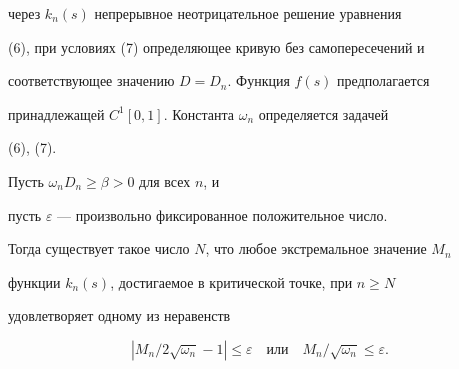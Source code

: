 через $k_n(s)$ непрерывное неотрицательное решение уравнения


(6), при условиях (7) определяющее кривую без самопересечений и


соответствующее значению $D=D_n$. Функция $f(s)$ предполагается


принадлежащей $C^1[0,1]$. Константа $\omega_n$ определяется задачей


(6), (7).





\begin{lem}


Пусть $\omega_n D_n \geq \beta > 0$ для всех $n$, и


пусть $\varepsilon$ --- произвольно фиксированное положительное число.


Тогда существует такое число $N$, что любое экстремальное значение $M_n$


функции $k_n(s)$, достигаемое в критической точке, при $n \geq N$


удовлетворяет одному из неравенств


$$


|M_n/2\sqrt {\omega_n}-1| \le \varepsilon


\quad \text{или} \quad


M_n/\sqrt {\omega_n}\le \varepsilon.


$$


\end{lem}





